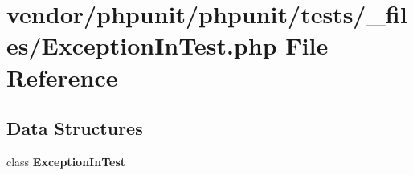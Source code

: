 \section{vendor/phpunit/phpunit/tests/\+\_\+files/\+Exception\+In\+Test.php File Reference}
\label{_exception_in_test_8php}
\subsection*{Data Structures}
\begin{DoxyCompactItemize}
\item 
class {\bf Exception\+In\+Test}
\end{DoxyCompactItemize}
